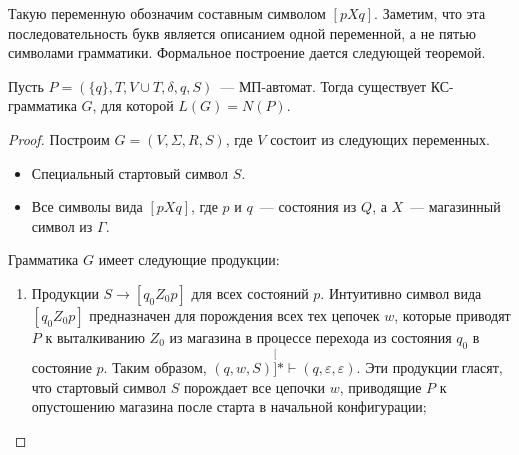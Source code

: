 \documentclass[a4paper,12pt]{article}
\begin{document}
Такую переменную обозначим составным символом $[pXq]$. Заметим, что эта последовательность букв является описанием одной переменной, а не пятью символами грамматики. Формальное построение дается следующей теоремой.
\begin{theorem}
	Пусть $P = (\{q\}, T, V \cup T, \delta, q, S)$~--- МП-автомат. Тогда существует КС-грамматика $G$, для которой $L(G) = N(P)$.
\end{theorem}
\begin{proof}
	Построим $G = (V, \Sigma, R, S)$, где $V$ состоит из следующих переменных.
	\begin{itemize}
		\item Специальный стартовый символ $S$.
		\item Все символы вида $[pXq]$, где $p$ и $q$~--- состояния из $Q$, а $X$~--- магазинный символ из $\Gamma$.
	\end{itemize}
	Грамматика $G$ имеет следующие продукции:
	\begin{enumerate}
		\item Продукции $S \to [q_0 Z_0 p]$ для всех состояний $p$. Интуитивно символ вида $[q_0 Z_0 p]$ предназначен для порождения всех тех цепочек $w$, которые приводят $P$ к выталкиванию $Z_0$ из магазина в процессе перехода из состояния $q_0$ в состояние $p$. Таким образом, $(q, w, S) \stackrel[]{*}{\vdash} (q, \varepsilon, \varepsilon)$. Эти продукции гласят, что стартовый символ $S$ порождает все цепочки $w$, приводящие $P$ к опустошению магазина после старта в начальной конфигурации;
		

\end{enumerate}
\end{proof}
\end{document}

